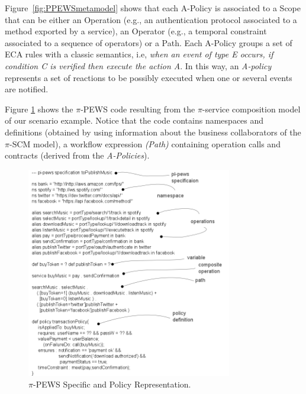 Figure~\ref{fig:PPEWSmetamodel} shows that each {\sc A-Policy} is associated to a {\sc Scope} that can be either an {\sc Operation} (e.g., an authentication protocol associated to a method exported by a service),  an {\sc Operator} (e.g., a temporal constraint associated to a sequence of operators) or a {\sc Path}.  
Each {\sc A-Policy} groups a set of ECA rules with a classic semantics, i.e, {\em when an event of type E occurs, if condition C is verified then execute the action A}.  
In this way, an {\em A-policy} represents a set of reactions to be possibly executed when one or several events are notified.
 

\begin{example}\label{ex:toPublicMusic5}
Figure \ref{fig:Specific-Contract-Representation} shows the $\pi$-PEWS code resulting from the $\pi$-service composition model of our scenario example.
Notice that the code contains namespaces and definitions (obtained by using information about the business collaborators of the $\pi$-SCM model), a workflow expression \textit{(Path)} containing operation calls and contracts (derived from the \textit{A-Policies}).
\end{example}

\begin{figure} 
\centering
\includegraphics[width=0.8\textwidth]{figs/pi-pewsSpecification-toPublishMusic}
\caption{$\pi$-PEWS Specific and Policy Representation.}
\label{fig:Specific-Contract-Representation}
\end{figure}

